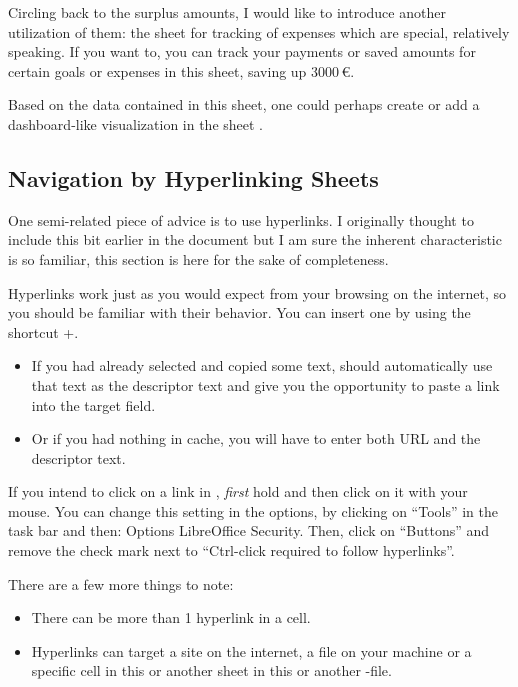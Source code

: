 Circling back to the surplus amounts, I would like to introduce another utilization of them: the sheet for tracking of expenses which are special, relatively speaking.
If you want to, you can track your payments or saved amounts for certain goals or expenses in this sheet, \ie saving up 3000\,€.

Based on the data contained in this sheet, one could perhaps create or add a dashboard-like visualization in the sheet .



\subsection{Navigation by Hyperlinking Sheets}
\label{subsec:navigation-hyperlinking-sheets}

One semi-related piece of advice is to use hyperlinks.
I originally thought to include this bit earlier in the document but I am sure the inherent characteristic is so familiar, this section is here for the sake of completeness.

Hyperlinks work just as you would expect from your browsing on the internet, so you should be familiar with their behavior.
You can insert one by using the shortcut +.
\begin{itemize}
	\item If you had already selected and copied some text, \loc should automatically use that text as the descriptor text and give you the opportunity to paste a link into the target field.
	\item Or if you had nothing in cache, you will have to enter both URL and the descriptor text.
\end{itemize}

If you intend to click on a link in \loc, \emph{first} hold  and then click on it with your mouse.
You can change this setting in the options, by clicking on ``Tools'' in the task bar and then: Options \structurenext LibreOffice \structurenext Security.
Then, click on ``Buttons'' and remove the check mark next to ``Ctrl-click required to follow hyperlinks''.

There are a few more things to note:
\begin{itemize}
	\item There can be more than 1 hyperlink in a cell.
	\item Hyperlinks can target a site on the internet, a file on your machine or a specific cell in this or another sheet in this or another \loc-file.
\end{itemize}

